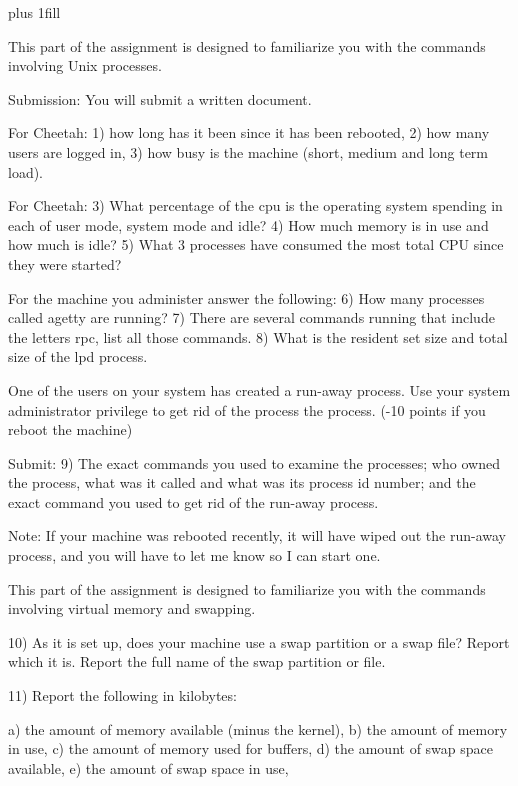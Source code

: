 
\rightskip=0pt plus 1fill

\parindent 0pt

This part of the assignment is designed to familiarize you with the
commands involving Unix processes.

Submission: You will submit a written document.

For Cheetah: 1) how long has it been since it has
been rebooted, 2) how many users are logged in, 3) how busy is the machine
(short, medium and long term load).

For Cheetah: 3) What percentage of the cpu is the operating system
spending in each of user mode, system mode and idle?
4) How much memory is in use and
how much is idle?
5) What 3 processes have consumed the most total CPU since
they were started?

For the machine you administer answer the following:
6) How many processes called {\ltt{}agetty} are running?
7) There are several commands running that include the letters {\ltt{}rpc},
list all those commands.
8) What is the resident set size and total size of the lpd process.

One of the users on your system has created a run-away process.
Use your system administrator privilege to
get rid of the process the process.
(-10 points if you reboot the machine)

Submit: 9) The exact commands you used to examine the processes;
who owned the process, what was it called and what was its
process id number;
and the exact command you used to get rid of the run-away process.

Note: If your machine was rebooted recently, it will have wiped
out the run-away process, and you will have to let me know so
I can start one.

This part of the assignment is designed to familiarize you with the
commands involving virtual memory and swapping.

10) As it is set up,
does your machine use a swap partition or a swap file? 
Report which it is.
Report the full name of the swap partition or file.

11) Report the following in kilobytes:

a) the amount of memory available (minus the kernel),
\break
b) the amount of memory in use,
\break
c) the amount of memory used for buffers,
\break
d) the amount of swap space available,
\break
e) the amount of swap space in use,

